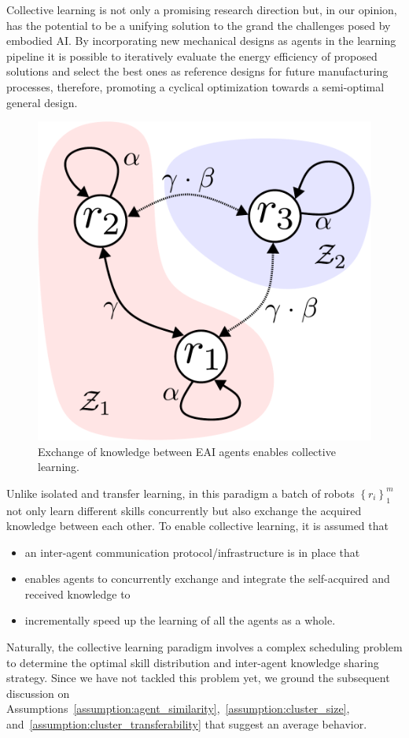 Collective learning is not only a promising research direction but, in our opinion, has the potential to be a unifying solution to the grand the challenges posed by embodied AI. By incorporating new mechanical designs as agents in the learning pipeline it is possible to iteratively evaluate the energy efficiency of proposed solutions and select the best ones as reference designs for future manufacturing processes, therefore, promoting a cyclical optimization towards a semi-optimal general design.


\begin{figure}[!th]
	\centering
	\includegraphics[width=0.7\columnwidth]{fig/cl_example_figure.pdf}
	\caption{Exchange of knowledge between EAI agents enables collective learning.}
	\label{fig:cl_example_figure}
\end{figure}
Unlike isolated and transfer learning, in this paradigm a batch of robots $\left \lbrace r_i \right \rbrace^m_{1}$ not only learn different skills concurrently but also exchange the acquired knowledge between each other. To enable collective learning, it is assumed that
\begin{itemize}
	\item an inter-agent communication protocol/infrastructure is in place that
	\item enables agents to concurrently exchange and integrate the self-acquired and received knowledge to
	\item incrementally speed up the learning of all the agents as a whole.
\end{itemize}
Naturally, the collective learning paradigm involves a complex scheduling problem to determine the optimal skill distribution and inter-agent knowledge sharing strategy. Since we have not tackled this problem yet, we ground the subsequent discussion on Assumptions~\ref{assumption:agent_similarity},~\ref{assumption:cluster_size}, and~\ref{assumption:cluster_transferability} that suggest an average behavior.

